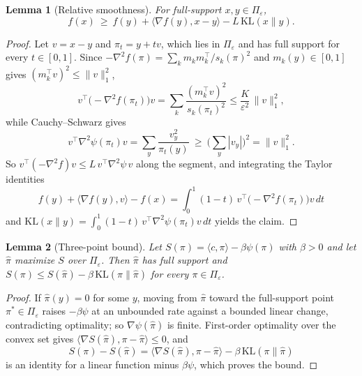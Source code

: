 \documentclass[letterpaper]{article} %
\newtheorem{lemma}{Lemma}
\newcommand{\KL}{\mathrm{KL}}
\begin{document}
\begin{lemma}[Relative smoothness]\label{lem:relsmooth}
For full-support $x,y\in\Pi_\varepsilon$,
\[
f(x)\ \ge\ f(y)+\langle\nabla f(y),x-y\rangle-L\,\KL(x\|y).
\]
\end{lemma}
\begin{proof}
Let $v=x-y$ and $\pi_t=y+tv$, which lies in $\Pi_\varepsilon$ and has full support for every $t\in[0,1]$. Since $-\nabla^2f(\pi)=\sum_km_km_k^\top/s_k(\pi)^2$ and $m_k(y)\in[0,1]$ gives $(m_k^\top v)^2\le\|v\|_1^2$,
\[
v^\top\big({-}\nabla^2f(\pi_t)\big)v=\sum_k\frac{(m_k^\top v)^2}{s_k(\pi_t)^2}\le\frac{K}{\varepsilon^2}\,\|v\|_1^2,
\]
while Cauchy--Schwarz gives
\[
v^\top\nabla^2\psi(\pi_t)v=\sum_y\frac{v_y^2}{\pi_t(y)}\ \ge\ \Big(\sum_y|v_y|\Big)^{\!2}=\|v\|_1^2.
\]
So $v^\top(-\nabla^2f)v\le L\,v^\top\nabla^2\psi\,v$ along the segment, and integrating the Taylor identities
\[
f(y)+\langle\nabla f(y),v\rangle-f(x)=\int_0^1\!(1{-}t)\,v^\top\big({-}\nabla^2f(\pi_t)\big)v\,dt
\]
and $\KL(x\|y)=\int_0^1(1{-}t)\,v^\top\nabla^2\psi(\pi_t)v\,dt$ yields the claim.
\end{proof}

\begin{lemma}[Three-point bound]\label{lem:threept}
Let $S(\pi)=\langle c,\pi\rangle-\beta\psi(\pi)$ with $\beta>0$ and let $\hat\pi$ maximize $S$ over $\Pi_\varepsilon$. Then $\hat\pi$ has full support and $S(\pi)\le S(\hat\pi)-\beta\,\KL(\pi\|\hat\pi)$ for every $\pi\in\Pi_\varepsilon$.
\end{lemma}
\begin{proof}
If $\hat\pi(y)=0$ for some $y$, moving from $\hat\pi$ toward the full-support point $\pi^\ast\in\Pi_\varepsilon$ raises $-\beta\psi$ at an unbounded rate against a bounded linear change, contradicting optimality; so $\nabla\psi(\hat\pi)$ is finite. First-order optimality over the convex set gives $\langle\nabla S(\hat\pi),\pi-\hat\pi\rangle\le0$, and
\[
S(\pi)-S(\hat\pi)=\langle\nabla S(\hat\pi),\pi-\hat\pi\rangle-\beta\,\KL(\pi\|\hat\pi)
\]
is an identity for a linear function minus $\beta\psi$, which proves the bound.
\end{proof}
\end{document}
